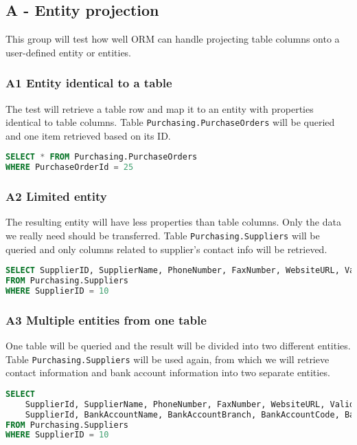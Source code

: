 \subsection{A - Entity projection}
This group will test how well ORM can handle projecting table columns onto a user-defined entity or entities.

\subsubsection*{A1 Entity identical to a table} \label{query:a1}
The test will retrieve a table row and map it to an entity with properties identical to table columns. 
Table \texttt{Purchasing.PurchaseOrders} will be queried and one item retrieved based on its ID.

\begin{lstlisting}[language=SQL]
SELECT * FROM Purchasing.PurchaseOrders 
WHERE PurchaseOrderId = 25
\end{lstlisting}

\subsubsection*{A2 Limited entity} \label{query:a2}
The resulting entity will have less properties than table columns. Only the data we really need should be transferred. 
Table \texttt{Purchasing.Suppliers} will be queried and only columns related to supplier's contact info will be retrieved.

\begin{lstlisting}[language=SQL]
SELECT SupplierID, SupplierName, PhoneNumber, FaxNumber, WebsiteURL, ValidFrom, ValidTo 
FROM Purchasing.Suppliers 
WHERE SupplierID = 10
\end{lstlisting}

\subsubsection*{A3 Multiple entities from one table} \label{query:a3}
One table will be queried and the result will be divided into two different entities. 
Table \texttt{Purchasing.Suppliers} will be used again, from which we will retrieve contact information and bank account information into two separate entities. 

\begin{lstlisting}[language=SQL]
SELECT 
    SupplierId, SupplierName, PhoneNumber, FaxNumber, WebsiteURL, ValidFrom, ValidTo, 
    SupplierId, BankAccountName, BankAccountBranch, BankAccountCode, BankAccountNumber, BankInternationalCode 
FROM Purchasing.Suppliers 
WHERE SupplierID = 10
\end{lstlisting}

